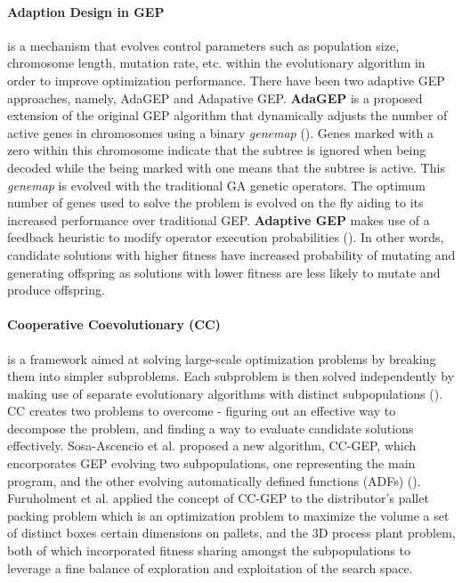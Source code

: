 \noindent \paragraph{Adaption Design in GEP} is a mechanism that evolves control parameters such as population size, chromosome length, mutation rate, etc. within the evolutionary algorithm in order to improve optimization performance. There have been two adaptive GEP approaches, namely, AdaGEP and Adapative GEP. \textbf{AdaGEP} is a proposed extension of the original GEP algorithm that dynamically adjusts the number of active genes in chromosomes using a binary \textit{genemap} (\cite{bautu2007adagep}). Genes marked with a zero within this chromosome indicate that the subtree is ignored when being decoded while the being marked with one means that the subtree is active. This \textit{genemap} is evolved with the traditional GA genetic operators. The optimum number of genes used to solve the problem is evolved on the fly aiding to its increased performance over traditional GEP. \textbf{Adaptive GEP} makes use of a feedback heuristic to modify operator execution probabilities (\cite{mwaura2009adaptive}). In other words, candidate solutions with higher fitness have increased probability of mutating and generating offspring as solutions with lower fitness are less likely to mutate and produce offspring. \bigskip

\noindent \paragraph{Cooperative Coevolutionary (CC)} is a framework aimed at solving large-scale optimization problems by breaking them into simpler subproblems. Each subproblem is then solved independently by making use of separate evolutionary algorithms with distinct subpopulations (\cite{zhong2017gene}). CC creates two problems to overcome - figuring out an effective way to decompose the problem, and finding a way to evaluate candidate solutions effectively. Sosa-Ascencio et al. proposed a new algorithm, CC-GEP, which encorporates GEP evolving two subpopulations, one representing the main program, and the other evolving automatically defined functions (ADFs) (\cite{zhong2017gene}). Furuholment et al. applied the concept of CC-GEP to the distributor's pallet packing problem which is an optimization problem to maximize the volume a set of distinct boxes certain dimensions on pallets, and the 3D process plant problem, both of which incorporated fitness sharing amongst the subpopulations to leverage a fine balance of exploration and exploitation of the search space. \bigskip

